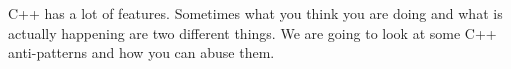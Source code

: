 \def\abstracttitle{Fun With C++}
\def\abstractcomment{Lightning Talk}
\def\abstractowner{Carly}

\thispagestyle{abstract}

C++ has a lot of features. Sometimes what you think you are doing and what is actually happening are two different things. We are going to look at some C++ anti-patterns and how you can abuse them.\\
